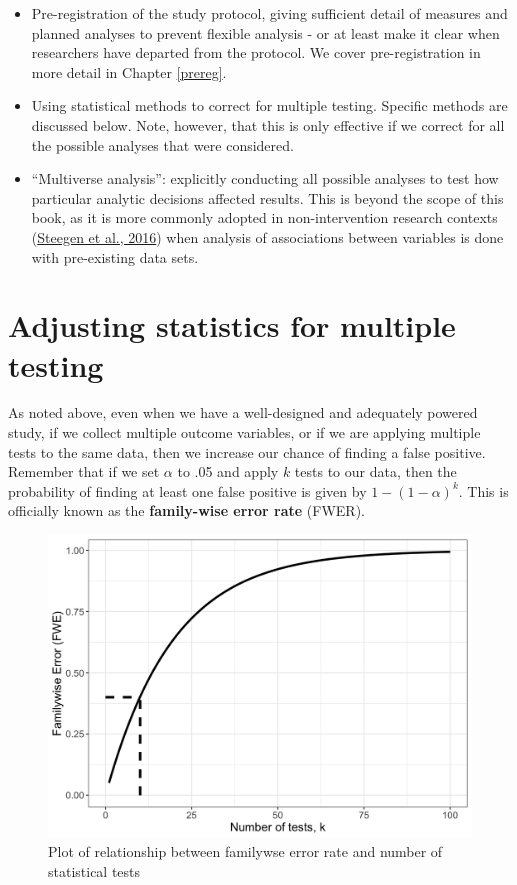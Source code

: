 \documentclass{krantz}
\begin{document}
\begin{itemize}
\item
  Pre-registration of the study protocol, giving sufficient detail of measures and planned analyses to prevent flexible analysis - or at least make it clear when researchers have departed from the protocol. We cover pre-registration in more detail in Chapter \ref{prereg}.
\item
  Using statistical methods to correct for multiple testing. Specific methods are discussed below. Note, however, that this is only effective if we correct for all the possible analyses that were considered.
\item
  ``Multiverse analysis'': explicitly conducting all possible analyses to test how particular analytic decisions affected results. This is beyond the scope of this book, as it is more commonly adopted in non-intervention research contexts (\protect\hyperlink{ref-steegen2016}{Steegen et al., 2016}) when analysis of associations between variables is done with pre-existing data sets.
\end{itemize}

\hypertarget{adjusting-statistics-for-multiple-testing}{%
\section{Adjusting statistics for multiple testing}\label{adjusting-statistics-for-multiple-testing}}

As noted above, even when we have a well-designed and adequately powered study, if we collect multiple outcome variables, or if we are applying multiple tests to the same data, then we increase our chance of finding a false positive. Remember that if we set \(\alpha\) to .05 and apply \(k\) tests to our data, then the probability of finding at least one false positive is given by \(1-(1-\alpha)^{k}\). This is officially known as the \textbf{family-wise error rate} (FWER).

\begin{figure}
\includegraphics[width=0.8\linewidth]{images_bw/familywise} \caption{Plot of relationship between familywse error rate and number of statistical tests}\label{fig:familywise}
\end{figure}
\end{document}
